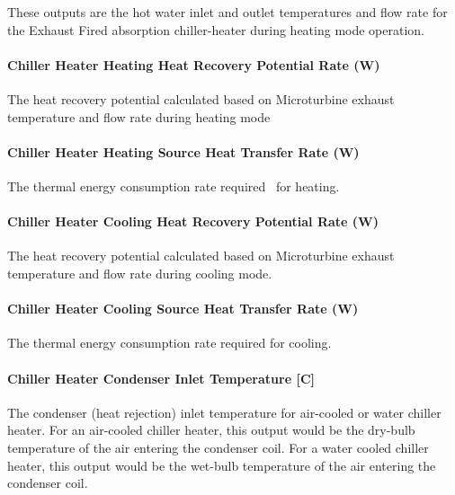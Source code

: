 These outputs are the hot water inlet and outlet temperatures and flow rate for the Exhaust Fired absorption chiller-heater during heating mode operation.

\paragraph{Chiller Heater Heating Heat Recovery Potential Rate (W)}\label{chiller-heater-heating-heat-recovery-potential-rate-w}

The heat recovery potential calculated based on Microturbine exhaust temperature and flow rate during heating mode

\paragraph{Chiller Heater Heating Source Heat Transfer Rate (W)}\label{chiller-heater-heating-source-heat-transfer-rate-w}

The thermal energy consumption rate required~ for heating.

\paragraph{Chiller Heater Cooling Heat Recovery Potential Rate (W)}\label{chiller-heater-cooling-heat-recovery-potential-rate-w}

The heat recovery potential calculated based on Microturbine exhaust temperature and flow rate during cooling mode.

\paragraph{Chiller Heater Cooling Source Heat Transfer Rate (W)}\label{chiller-heater-cooling-source-heat-transfer-rate-w}

The thermal energy consumption rate required for cooling.

\paragraph{Chiller Heater Condenser Inlet Temperature {[}C{]}}\label{chiller-heater-condenser-inlet-temperature-c}

The condenser (heat rejection) inlet temperature for air-cooled or water chiller heater. For an air-cooled chiller heater, this output would be the dry-bulb temperature of the air entering the condenser coil. For a water cooled chiller heater, this output would be the wet-bulb temperature of the air entering the condenser coil.

